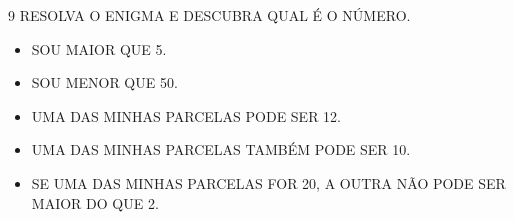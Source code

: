 \vspace{2cm}

\num{9} RESOLVA O ENIGMA E DESCUBRA QUAL É O NÚMERO.

\begin{itemize}
\item SOU MAIOR QUE 5.

\item SOU MENOR QUE 50.

\item UMA DAS MINHAS PARCELAS PODE SER 12.

\item UMA DAS MINHAS PARCELAS TAMBÉM PODE SER 10.

\item SE UMA DAS MINHAS PARCELAS FOR 20, A OUTRA NÃO PODE SER MAIOR DO QUE 2.
\end{itemize}









